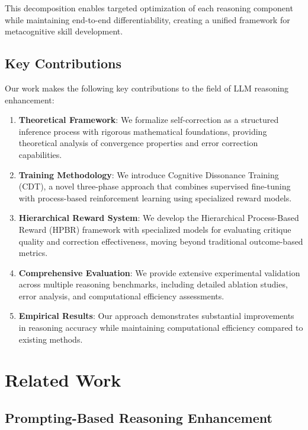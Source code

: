 \documentclass[10pt,twocolumn]{article}
\newcommand{\cdt}{\textsc{CDT}}
\newcommand{\hpbr}{\textsc{HPBR}}
\begin{document}
This decomposition enables targeted optimization of each reasoning component while maintaining end-to-end differentiability, creating a unified framework for metacognitive skill development.

\subsection{Key Contributions}

Our work makes the following key contributions to the field of LLM reasoning enhancement:

\begin{enumerate}
\item \textbf{Theoretical Framework}: We formalize self-correction as a structured inference process with rigorous mathematical foundations, providing theoretical analysis of convergence properties and error correction capabilities.

\item \textbf{Training Methodology}: We introduce Cognitive Dissonance Training (\cdt{}), a novel three-phase approach that combines supervised fine-tuning with process-based reinforcement learning using specialized reward models.

\item \textbf{Hierarchical Reward System}: We develop the Hierarchical Process-Based Reward (\hpbr{}) framework with specialized models for evaluating critique quality and correction effectiveness, moving beyond traditional outcome-based metrics.

\item \textbf{Comprehensive Evaluation}: We provide extensive experimental validation across multiple reasoning benchmarks, including detailed ablation studies, error analysis, and computational efficiency assessments.

\item \textbf{Empirical Results}: Our approach demonstrates substantial improvements in reasoning accuracy while maintaining computational efficiency compared to existing methods.
\end{enumerate}

\section{Related Work}

\subsection{Prompting-Based Reasoning Enhancement}
\end{document}
